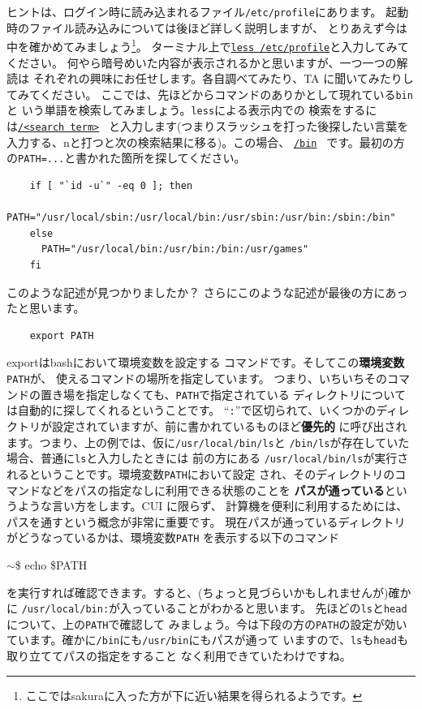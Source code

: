 \documentclass[a4j]{ltjreport}
\begin{document}
    \vspace*{3mm}

    ヒントは、ログイン時に読み込まれるファイル\verb+/etc/profile+にあります。
    起動時のファイル読み込みについては後ほど詳しく説明しますが、
    とりあえず今は中を確かめてみましょう\footnote{ここではsakuraに入った方が下に近い結果を得られるようです。}。
    ターミナル上で\underline{\texttt{less /etc/profile}}と入力してみてください。
    何やら暗号めいた内容が表示されるかと思いますが、一つ一つの解読は
    それぞれの興味にお任せします。各自調べてみたり、TA に聞いてみたりしてみてください。
    ここでは、先ほどからコマンドのありかとして現れている\verb+bin+と
    いう単語を検索してみましょう。\verb+less+による表示内での
    検索をするには\underline{\texttt{/<search term>}} \return~と入力します(つまりスラッシュを打った後探したい言葉を入力する、nと打つと次の検索結果に移る)。この場合、
    \underline{\texttt{/bin}} \return~です。最初の方の\verb+PATH=...+と書かれた箇所を探してください。
    \begin{verbatim}
    if [ "`id -u`" -eq 0 ]; then
      PATH="/usr/local/sbin:/usr/local/bin:/usr/sbin:/usr/bin:/sbin:/bin"
    else
      PATH="/usr/local/bin:/usr/bin:/bin:/usr/games"
    fi
    \end{verbatim}

    このような記述が見つかりましたか？
    さらにこのような記述が最後の方にあったと思います。
    \begin{verbatim}
    export PATH
    \end{verbatim}

    exportはbashにおいて環境変数を設定する
    コマンドです。そしてこの\textbf{環境変数} \verb+PATH+が、
    使えるコマンドの場所を指定しています。
    つまり、いちいちそのコマンドの置き場を指定しなくても、\verb+PATH+で指定されている
    ディレクトリについては自動的に探してくれるということです。
    ``\verb+:+''で区切られて、いくつかのディレクトリが設定されていますが、前に書かれているものほど\textbf{優先的}
    に呼び出されます。つまり、上の例では、仮に\verb+/usr/local/bin/ls+と
    \verb+/bin/ls+が存在していた場合、普通に\verb+ls+と入力したときには
    前の方にある
    \verb+/usr/local/bin/ls+が実行されるということです。環境変数\verb+PATH+において設定
    され、そのディレクトリのコマンドなどをパスの指定なしに利用できる状態のことを
    \textbf{パスが通っている}というような言い方をします。CUI に限らず、
    計算機を便利に利用するためには、パスを通すという概念が非常に重要です。
    現在パスが通っているディレクトリがどうなっているかは、環境変数\verb+PATH+
    を表示する以下のコマンド
    \begin{screen}
    $\sim$\$ echo \$PATH
    \end{screen}
    を実行すれば確認できます。すると、(ちょっと見づらいかもしれませんが)確かに
    \verb+/usr/local/bin:+が入っていることがわかると思います。
    先ほどの\verb+ls+と\verb+head+について、上の\verb+PATH+で確認して
    みましょう。今は下段の方の\verb+PATH+の設定が効いています。確かに\verb+/bin+にも\verb+/usr/bin+にもパスが通って
    いますので、\verb+ls+も\verb+head+も取り立ててパスの指定をすること
    なく利用できていたわけですね。
\end{document}
